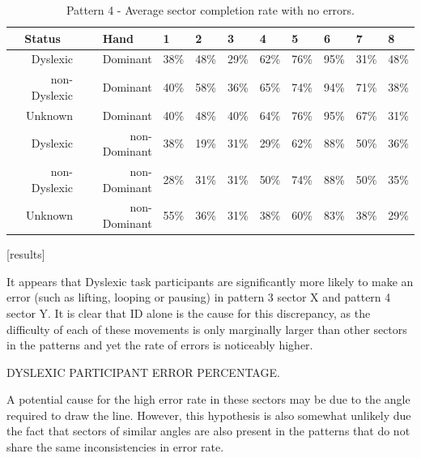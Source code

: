 		\begin{table}[]
			\centering
			\caption{Pattern 4 - Average sector completion rate with no errors.}
			\label{tab_pat_4_com}
			\begin{tabularx}{\textwidth}{|r|r|X|X|X|X|X|X|X|X|}
				\hline
				\multicolumn{1}{|c|}{\textbf{Status}} & \multicolumn{1}{c|}{\textbf{Hand}} & \textbf{1} & \textbf{2} & \textbf{3} & \textbf{4} & \textbf{5} & \textbf{6} & \textbf{7} & \textbf{8} \\ \hline
				Dyslexic                              & Dominant                           & 38\%       & 48\%       & 29\%       & 62\%       & 76\%       & 95\%       & 31\%       & 48\%       \\ \hline
				non-Dyslexic                          & Dominant                           & 40\%       & 58\%       & 36\%       & 65\%       & 74\%       & 94\%       & 71\%       & 38\%       \\ \hline
				Unknown                    & Dominant                           & 40\%       & 48\%       & 40\%       & 64\%       & 76\%       & 95\%       & 67\%       & 31\%       \\ \hline
				Dyslexic                              & non-Dominant                       & 38\%       & 19\%       & 31\%       & 29\%       & 62\%       & 88\%       & 50\%       & 36\%       \\ \hline
				non-Dyslexic                          & non-Dominant                       & 28\%       & 31\%       & 31\%       & 50\%       & 74\%       & 88\%       & 50\%       & 35\%       \\ \hline
				Unknown                    & non-Dominant                       & 55\%       & 36\%       & 31\%       & 38\%       & 60\%       & 83\%       & 38\%       & 29\%       \\ \hline
			\end{tabularx}
		\end{table}
		[results]
		
		It appears that Dyslexic task participants are significantly more likely to make an error (such as lifting, looping or pausing) in pattern 3 sector X and pattern 4 sector Y. It is clear that ID alone is the cause for this discrepancy, as the difficulty of each of these movements is only marginally larger than other sectors in the patterns and yet the rate of errors is noticeably higher.
		
		DYSLEXIC PARTICIPANT ERROR PERCENTAGE.
		
		A potential cause for the high error rate in these sectors may be due to the angle required to draw the line. However, this hypothesis is also somewhat unlikely due the fact that sectors of similar angles are also present in the patterns that do not share the same inconsistencies in error rate. 
		
